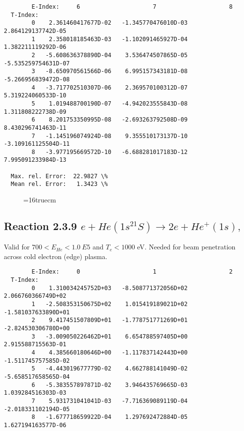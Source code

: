 \documentclass[12pt,dvipdfmx]{article}
\begin{document}
{\begin{small}
\begin{verbatim}
        E-Index:     6                     7                     8
  T-Index:
        0    2.361460417677D-02   -1.345770476010D-03    2.864129137742D-05
        1    2.358018185463D-03   -1.102091465927D-04    1.382211119292D-06
        2   -5.608636378890D-04    3.536474507865D-05   -5.535259754631D-07
        3   -8.650970561566D-06    6.995157343181D-08   -5.266956839472D-08
        4   -3.717702510307D-06    2.369570100312D-07    5.319224060533D-10
        5    1.019488700190D-07   -4.942023555843D-08    1.311808222738D-09
        6    8.201753350995D-08   -2.693263792508D-09    8.430296741463D-11
        7   -1.145196074924D-08    9.355510173137D-10   -3.109161125504D-11
        8   -3.977195669572D-10   -6.688281017183D-12    7.995091233984D-13

  Max. rel. Error:  22.9827 \%
  Mean rel. Error:   1.3423 \%

\end{verbatim}\end{small}

\begin{figure} \label{2.1.5H3}
\epsfxsize=16truecm
\end{figure}

\newpage
\subsection{
Reaction 2.3.9  $e + He(1s^21S) \rightarrow 2e + He^+(1s) ,\ $ }

Valid for $ 700 < E_{He} < 1.0~ E5$ and $T_e  < 1000$ eV.
Needed for beam penetration across cold electron (edge) plasma.

\begin{small}\begin{verbatim}
        E-Index:     0                     1                     2
  T-Index:
        0    1.310034245752D+03   -8.508771372056D+02    2.066760366749D+02
        1   -2.508353150675D+02    1.015419189021D+02   -1.581037633890D+01
        2    9.417451507809D+01   -1.778751771269D+01   -2.824530306780D+00
        3   -3.009050226462D+01    6.654788597405D+00    2.915588715563D-01
        4    4.385660180646D+00   -1.117837142443D+00   -1.511745757585D-02
        5   -4.443019677779D-02    4.662788141049D-02   -5.658517658565D-04
        6   -5.383557897871D-02    3.946435769665D-03    1.039284516303D-03
        7    5.931731041041D-03   -7.716369089119D-04   -2.018331102194D-05
        8   -1.677718659922D-04    1.297692472884D-05    1.627194163577D-06


\end{verbatim}
\end{small}}
\end{document}

